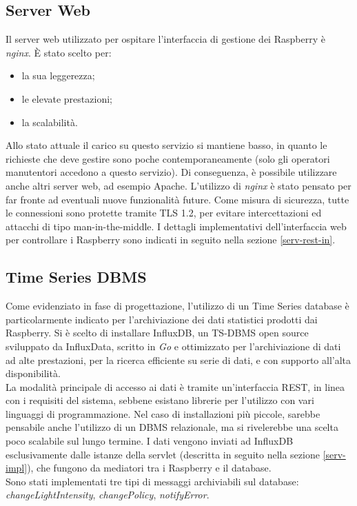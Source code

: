 \subsection{Server Web}
Il server web utilizzato per ospitare l'interfaccia di gestione dei Raspberry è \textit{nginx}. È stato scelto per:
\begin{itemize}
 \item la sua leggerezza;
 \item le elevate prestazioni;
 \item la scalabilità.
\end{itemize}
Allo stato attuale il carico su questo servizio si mantiene basso, in quanto le richieste che deve gestire sono poche contemporaneamente (solo gli operatori manutentori accedono a questo servizio).
Di conseguenza, è possibile utilizzare anche altri server web, ad esempio Apache. L'utilizzo di \textit{nginx} è stato pensato per far fronte ad eventuali nuove funzionalità future.
Come misura di sicurezza, tutte le connessioni sono protette tramite TLS 1.2, per evitare intercettazioni ed attacchi di tipo man-in-the-middle.
I dettagli implementativi dell'interfaccia web per controllare i Raspberry sono indicati in seguito nella sezione \ref{serv-rest-in}.

\subsection{Time Series DBMS \label{tsdbms}}
Come evidenziato in fase di progettazione, l'utilizzo di un Time Series database è particolarmente indicato per l'archiviazione dei dati statistici prodotti dai Raspberry.
Si è scelto di installare InfluxDB, un TS-DBMS open source sviluppato da InfluxData, scritto in \textit{Go} e ottimizzato per l'archiviazione di dati ad alte prestazioni, per la ricerca efficiente su serie di dati, e con supporto all'alta disponibilità.
\\La modalità principale di accesso ai dati è tramite un'interfaccia REST, in linea con i requisiti del sistema, sebbene esistano librerie per l'utilizzo con vari linguaggi di programmazione.
Nel caso di installazioni più piccole, sarebbe pensabile anche l'utilizzo di un DBMS relazionale, ma si rivelerebbe una scelta poco scalabile sul lungo termine.
I dati vengono inviati ad InfluxDB esclusivamente dalle istanze della servlet (descritta in seguito nella sezione \ref{serv-impl}), che fungono da mediatori tra i Raspberry e il database.
\\Sono stati implementati tre tipi di messaggi archiviabili sul database: \textit{changeLightIntensity}, \textit{changePolicy}, \textit{notifyError}.
